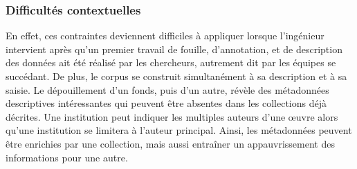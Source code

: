 \subsubsection{Difficultés contextuelles}
En effet, ces contraintes deviennent difficiles à appliquer lorsque l'ingénieur intervient après qu'un premier travail de fouille, d'annotation, et de description des données ait été réalisé par les chercheurs, autrement dit par les équipes se succédant. De plus, le corpus se construit simultanément à sa description et à sa saisie. Le dépouillement d'un fonds, puis d'un autre, révèle des métadonnées descriptives intéressantes qui peuvent être absentes dans les collections déjà décrites. Une institution peut indiquer les multiples auteurs d'une œuvre alors qu'une institution se limitera à l'auteur principal. Ainsi, les métadonnées peuvent être enrichies par une collection, mais aussi entraîner un appauvrissement des informations pour une autre.

